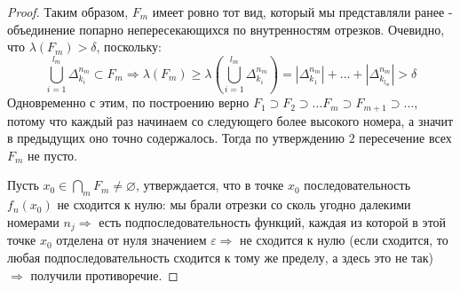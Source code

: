 \documentclass[12pt]{article}
\newcommand{\VN}{\varnothing}
\newcommand{\VE}{\varepsilon}
\theoremstyle{definition}
\begin{document}
\begin{proof}
	Таким образом, $F_m$ имеет ровно тот вид, который мы представляли ранее - объединение попарно непересекающихся по внутренностям отрезков. Очевидно, что $\lambda(F_m) > \delta$, поскольку:
	$$
		\bigcup\limits_{i = 1}^{l_m}\Delta_{k_i}^{n_m}\subset F_m \Rightarrow \lambda(F_m) \geq \lambda\left(\bigcup\limits_{i = 1}^{l_m}\Delta_{k_i}^{n_m}\right) = \left|\Delta_{k_1}^{n_m}\right| +  \dotsc + \left|\Delta_{k_{l_m}}^{n_m}\right| > \delta
	$$
	Одновременно с этим, по построению верно $F_1 \supset F_2 \supset \dotsc F_m \supset F_{m+1} \supset \dotsc$, потому что каждый раз начинаем со следующего более высокого номера, а значит в предыдущих оно точно содержалось. Тогда по утверждению $2$ пересечение всех $F_m$ не пусто.
	
	Пусть $x_0 \in \bigcap\limits_{m} F_m \neq \VN$, утверждается, что в точке $x_0$ последовательность $f_n(x_0)$ не сходится к нулю: мы брали отрезки со сколь угодно далекими номерами $n_j \Rightarrow$ есть подпоследовательность функций, каждая из которой в этой точке $x_0$ отделена от нуля значением $\VE \Rightarrow$ не сходится к нулю (если сходится, то любая подпоследовательность сходится к тому же пределу, а здесь это не так) $\Rightarrow$ получили противоречие.
\end{proof}
\end{document}
